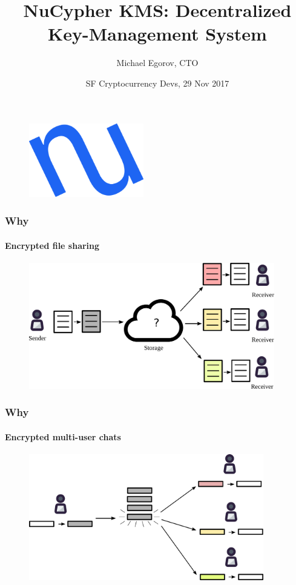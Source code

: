 \documentclass[xetex,mathsans,sans]{beamer}
\title[NuCypher KMS]{NuCypher KMS: Decentralized Key-Management System}
\author[Michael]{Michael Egorov, CTO}
\date[29 Nov 2017]{SF Cryptocurrency Devs, 29 Nov 2017}
\begin{document}
    \begin{frame}
        \titlepage
        \begin{figure}
            \centering
            \includegraphics[width=5cm]{pdf/nucypher_logo.pdf}
        \end{figure}
    \end{frame}

    \begin{frame}
        \frametitle{Why}
        \framesubtitle{Encrypted file sharing}
        \begin{figure}
            \centering
            \includegraphics[height=5.5cm]{pdf/file-sharing.pdf}
        \end{figure}
    \end{frame}

    \begin{frame}
        \frametitle{Why}
        \framesubtitle{Encrypted multi-user chats}
        \begin{figure}
            \centering
            \includegraphics[height=5.5cm]{pdf/chats.pdf}
        \end{figure}
    \end{frame}
\end{document}
